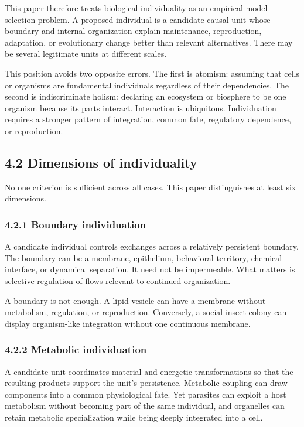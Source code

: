 \documentclass[
  11pt,
]{article}
\begin{document}
This paper therefore treats biological individuality as an empirical
model-selection problem. A proposed individual is a candidate causal
unit whose boundary and internal organization explain maintenance,
reproduction, adaptation, or evolutionary change better than relevant
alternatives. There may be several legitimate units at different scales.

This position avoids two opposite errors. The first is atomism: assuming
that cells or organisms are fundamental individuals regardless of their
dependencies. The second is indiscriminate holism: declaring an
ecosystem or biosphere to be one organism because its parts interact.
Interaction is ubiquitous. Individuation requires a stronger pattern of
integration, common fate, regulatory dependence, or reproduction.

\subsection{4.2 Dimensions of
individuality}\label{dimensions-of-individuality}

No one criterion is sufficient across all cases. This paper
distinguishes at least six dimensions.

\subsubsection{4.2.1 Boundary
individuation}\label{boundary-individuation}

A candidate individual controls exchanges across a relatively persistent
boundary. The boundary can be a membrane, epithelium, behavioral
territory, chemical interface, or dynamical separation. It need not be
impermeable. What matters is selective regulation of flows relevant to
continued organization.

A boundary is not enough. A lipid vesicle can have a membrane without
metabolism, regulation, or reproduction. Conversely, a social insect
colony can display organism-like integration without one continuous
membrane.

\subsubsection{4.2.2 Metabolic
individuation}\label{metabolic-individuation}

A candidate unit coordinates material and energetic transformations so
that the resulting products support the unit's persistence. Metabolic
coupling can draw components into a common physiological fate. Yet
parasites can exploit a host metabolism without becoming part of the
same individual, and organelles can retain metabolic specialization
while being deeply integrated into a cell.
\end{document}
